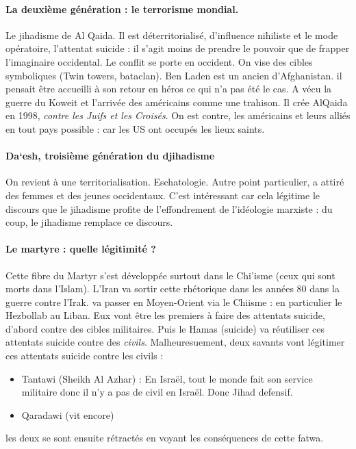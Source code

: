    

   \paragraph{La deuxième génération : le terrorisme mondial.}   Le jihadisme de Al Qaida. Il est déterritorialisé, d'influence nihiliste et le mode opératoire, l'attentat suicide : il s'agit moins de prendre le pouvoir que de frapper l'imaginaire occidental. Le conflit se porte en occident. On vise des cibles symboliques (Twin towers, bataclan).
   Ben Laden est un ancien d'Afghanistan. il pensait être accueilli à son retour en héros ce qui n'a pas été le cas. A vécu la guerre du Koweit et l'arrivée des américains comme une trahison. Il crée AlQaida en 1998, \textit{contre les Juifs et les Croisés}. On est contre, les américains et leurs alliés en tout pays possible : car les US ont occupés les lieux saints.
    
   

   \paragraph{Da`esh, troisième génération du djihadisme} On revient à une territorialisation. Eschatologie. Autre point particulier, a attiré des femmes et des jeunes occidentaux. C'est intéressant car cela légitime le discours que le jihadisme profite de l'effondrement de l'idéologie marxiste : du coup, le jihadisme remplace ce discours.   
    
   

   \paragraph{Le martyre : quelle légitimité ?}   
   Cette fibre du Martyr s'est développée surtout dans le Chi'isme (ceux qui sont morts dans l'Islam). L'Iran va sortir cette rhétorique dans les années 80 dans la guerre contre l'Irak. va passer en Moyen-Orient via le Chiisme : en particulier le Hezbollab au Liban. Eux vont être les premiers à faire des attentats suicide, d'abord contre des cibles militaires.
   Puis le Hamas (suicide) va réutiliser ces attentats suicide contre des \textit{civils}. Malheuresuement, deux savants vont légitimer ces attentats suicide contre les civils : 
   \begin{itemize}
       \item Tantawi (Sheikh Al Azhar) : En Israël, tout le monde fait son service militaire donc il n'y a pas de civil en Israël. Donc Jihad defensif.
       \item Qaradawi (vit encore)
   \end{itemize}
   les deux se sont ensuite rétractés en voyant les conséquences de cette fatwa.
    
